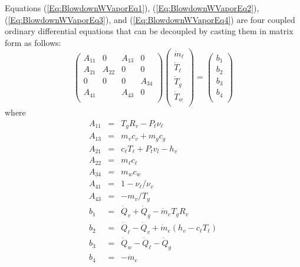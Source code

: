 Equations (\ref{Eq:BlowdownWVaporEq1}),
(\ref{Eq:BlowdownWVaporEq2}), (\ref{Eq:BlowdownWVaporEq3}), and
(\ref{Eq:BlowdownWVaporEq4}) are four coupled ordinary differential
equations that can be decoupled by casting them in matrix form as
follows:
%
\begin{equation}
   \left(\begin{array}{ccccccc}
   A_{11} & 0 & A_{13}  & 0 \\
    A_{21} & A_{22} & 0  & 0 \\
    0 & 0 & 0  & A_{34} \\
    A_{41} &  & A_{43}  & 0 \\
   \end{array}\right)
   \left(\begin{array}{c}
    \dot{m}_\ell \\
    \dot{T}_\ell  \\
    \dot{T}_g \\
   \dot{T}_w  \\
   \end{array}\right) =
   \left(\begin{array}{c}
    b_1\\
    b_2  \\
    b_3 \\
    b_4  \\
   \end{array}\right)
\end{equation}
%
where
%
\begin{eqnarray}
   A_{11}& = & T_g R_v - P_t \nu_\ell \label{Eq:BlowDownA11}\\
   A_{13}& = & m_v c_v + m_g c_g\\
   A_{21} & = & c_\ell T_\ell + P_t v_l - h_{v}\\
   A_{22} & = & m_\ell c_\ell\\
   A_{34} & = & m_w c_w\\
   A_{41} & = & 1  - \nu_\ell/\nu_v\\
   A_{43} & = & - m_v/T_g\\
   b_1 & = & \dot{Q}_v + \dot{Q}_g - \dot{m}_e T_g R_v \label{Eq:BlowDownb1}\\
   b_2 & = & \dot{Q}_\ell - \dot{Q}_v + \dot{m}_e (h_v - c_\ell T_\ell) \\
   b_3 & = & \dot{Q}_w -\dot{Q}_\ell - \dot{Q}_g\\
   b_4 & = & -\dot{m}_e \label{Eq:BlowDownb4}
\end{eqnarray}
%



